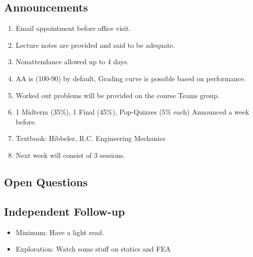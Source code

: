\subsection*{Announcements}
\begin{enumerate}
	\item Email appointment before office visit.
	\item Lecture notes are provided and said to be adequate.
	\item Nonattendance allowed up to 4 days.
	\item AA is (100-90) by default, Grading curve is possible based on performance.
	\item Worked out problems will be provided on the course Teams group.
	\item 1 Midterm (35\%), 1 Final (45\%), Pop-Quizzes (5\% each) 
	Announced a week before.  
	\item Textbook: Hibbeler, R.C. Engineering Mechanics
	\item Next week will consist of 3 sessions.
\end{enumerate}


\subsection*{Open Questions}

\subsection*{Independent Follow-up}
\begin{itemize}
	\item Minimum: Have a light read.
	\item Exploration: Watch some stuff on statics and FEA
\end{itemize}
